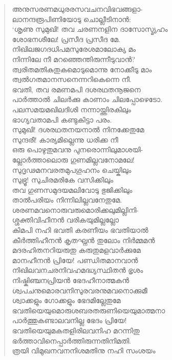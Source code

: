 \begin{verse}
അനുസരണമധുരരസവചനവിഭവങ്ങളാ-\\
ലാനന്ദരൂപിണിയോടു ചൊല്ലീടിനാന്‍:\\
‘ശൃണു സുമുഖി! തവ ചരണനളിന ദാസോസ്മ്യഹം\\
ശോഭനശീലേ! പ്രസീദ പ്രസീദ മേ.\\
നിഖിലജഗദധിപമസുരേശമാലോക്യ മം\\
നിന്നിലേ നീ മറഞ്ഞെന്തിരുന്നീടുവാന്‍?\\
ത്വരിതമതികുതുകമൊടുമൊന്നു നോക്കീടു മാം\\
ത്വല്‍ഗതമാനസനെന്നറികെന്നെ നീ.\\
ഭവതി, തവ രമണമപി ദശരഥതനൂജനെ\\
പാര്‍ത്താല്‍ ചിലര്‍ക്കു കാണാം ചിലപ്പോഴെടോ.\\
പലസമയമഖിലദിശി നന്നായ്ത്തിരകിലും\\
ഭാഗ്യവതാമപി കണ്ടുകിട്ടാ പരം.\\
സുമുഖി! ദശരഥതനയനാല്‍ നിനക്കേതുമേ\\
സുന്ദരീ! കാര്യമില്ലെന്നു ധരിക്ക നീ\\
ഒരു പൊഴുതുമവനു പുനരൊന്നിലുമാശയി-\\
ല്ലോര്‍ത്താലൊരു ഗുണമില്ലവനോമലേ!\\
സുദൃഢമനവരതമുപഗൂഹനം ചെയ്കിലും\\
സുഭ്രൂ! സുചിരമരികേ വസിക്കിലും\\
തവ ഗുണസമുദയമലിവോടു ഭുജിക്കിലും\\
താല്‍പരിയം നിന്നിലില്ലവനേതുമേ.\\
ശരണമവനൊരുവരുമൊരിക്കലുമില്ലിനി-\\
ശ്ശക്തിവിഹീനന്‍ വരികയുമില്ലല്ലോ\\
കിമപി നഹി ഭവതി കരണീയം ഭവതിയാല്‍\\
കീര്‍ത്തിഹീനന്‍ കൃതഘ്നന്‍ തുലോം നിര്‍മ്മമന്‍\\
മദരഹിതനറിയരുതു കരുതുമളവാര്‍ക്കുമേ\\
മാനഹീനന്‍ പ്രിയേ! പണ്ഡിതമാനവാന്‍\\
നിഖിലവനചരനിവഹമദ്ധ്യസ്ഥിതന്‍ ഭൃശം\\
നിഷ്കിഞ്ചനപ്രിയന്‍ ഭേദഹീനാത്മകന്‍\\
ശ്വപചനുമൊരവനിസുരവരനുമവനൊക്കുമീ\\
ശ്വാക്കളും ഗോക്കളും ഭേദമില്ലേതുമേ\\
ഭവതിയെയുമൊരുശബരതരുണിയെയുമാത്മനാ\\
പാര്‍ത്തുകണ്ടാലവനില്ല ഭേദം പ്രിയേ!\\
ഭവതിയെയുമകതളിരിലവനിഹ മറന്നിതു\\
ഭര്‍ത്താവിനെപ്പാര്‍ത്തിരുന്നതിനിമതി.\\
ത്രയി വിമുഖനവനനിശമതിനു നഹി സംശയം\\

\end{verse}
